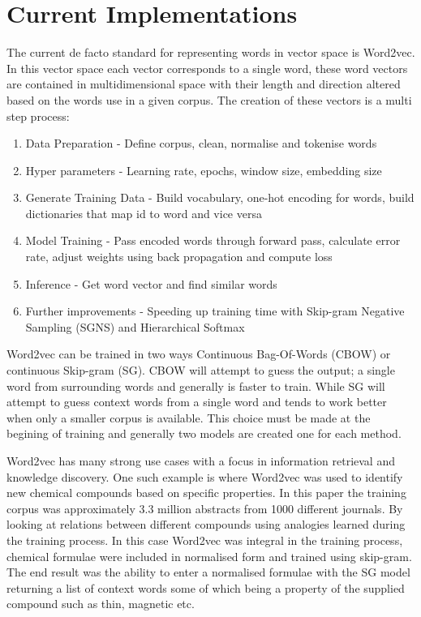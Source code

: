 \section{Current Implementations}
The current de facto standard for representing words in vector space is Word2vec. In this vector space each vector corresponds to a single word, these word vectors are contained in multidimensional space with their length and direction altered based on the words use in a given corpus. The creation of these vectors is a multi step process:
\begin{enumerate}
    \item Data Preparation - Define corpus, clean, normalise and tokenise words
    \item Hyper parameters - Learning rate, epochs, window size, embedding size
    \item Generate Training Data - Build vocabulary, one-hot encoding for words, build dictionaries that map id to word and vice versa
    \item Model Training - Pass encoded words through forward pass, calculate error rate, adjust weights using back propagation and compute loss
    \item Inference - Get word vector and find similar words
    \item Further improvements - Speeding up training time with Skip-gram Negative Sampling (SGNS) and Hierarchical Softmax
\end{enumerate}

\noindent
Word2vec can be trained in two ways Continuous Bag-Of-Words (CBOW) or continuous Skip-gram (SG). CBOW will attempt to guess the output; a single word from surrounding words and generally is faster to train. While SG will attempt to guess context words from a single word and tends to work better when only a smaller corpus is available. This choice must be made at the begining of training and generally two models are created one for each method. \cite{Mikolov}

Word2vec has many strong use cases with a focus in information retrieval and knowledge discovery. One such example is where Word2vec was used to identify new chemical compounds based on specific properties. In this paper the training corpus was approximately 3.3 million abstracts from 1000 different journals. By looking at relations between different compounds using analogies learned during the training process. In this case Word2vec was integral in the training process, chemical formulae were included in normalised form and trained using skip-gram. The end result was the ability to enter a normalised formulae with the SG model returning a list of context words some of which being a property of the supplied compound such as thin, magnetic etc. \cite{Tshitoyan}

